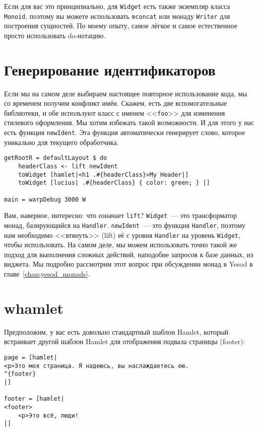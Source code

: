 \begin{remark}
    Если для вас это принципиально, для \lstinline'Widget' есть также экземпляр
    класса \lstinline'Monoid', поэтому вы можете использовать
    \lstinline'mconcat' или монаду \lstinline'Writer' для построения сущностей.
    По моему опыту, самое лёгкое и самое естественное просто использовать
    do-нотацию.
\end{remark}

\section{Генерирование идентификаторов}
Если мы на самом деле выбираем настоящее повторное использование кода, мы со
временем получим конфликт имён. Скажем, есть две вспомогательные библиотеки, и
обе используют класс с именем <<\lstinline'foo'>> для изменения стилевого
оформления. Мы хотим избежать такой возможности. И для этого у нас есть функция
\lstinline'newIdent'. Эта функция автоматически генерирует слово, которое
уникально для текущего обработчика.
\begin{lstlisting}[caption={Использование \lstinline'newIdent'}]
getRootR = defaultLayout $ do
    headerClass <- lift newIdent
    toWidget [hamlet|<h1 .#{headerClass}>My Header|]
    toWidget [lucius| .#{headerClass} { color: green; } |]

main = warpDebug 3000 W
\end{lstlisting}

\begin{remark}
    Вам, наверное, интересно: что означает \lstinline'lift'?
    \lstinline'Widget'~--- это трансформатор монад, базирующийся на
    \lstinline'Handler'. \lstinline'newIdent'~--- это функция
    \lstinline'Handler', поэтому нам необходимо <<втянуть>> (lift) её с уровня
    \lstinline'Handler' на уровень \lstinline'Widget', чтобы использовать. На
    самом деле, мы можем использовать точно такой же подход для выполнения
    сложных действий, наподобие запросов к базе данных, из виджета. Мы подробно
    рассмотрим этот вопрос при обсуждении монад в Yesod в
    главе~\ref{chap:yesod_monads}.
\end{remark}

\section{whamlet}
Предположим, у вас есть довольно стандартный шаблон Hamlet, который встраивает
другой шаблон Hamlet для отображения подвала страницы (footer):
\begin{lstlisting}
page = [hamlet|
<p>Это моя страница. Я надеюсь, вы наслаждаетесь ею.
^{footer}
|]

footer = [hamlet|
<footer>
    <p>Это всё, люди!
|]
\end{lstlisting}


